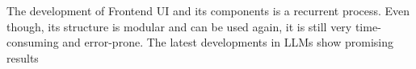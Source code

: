\chapter{\abstractname}

The development of Frontend UI and its components is a recurrent 
process. Even though, its structure is modular and can be used again, 
it is still very time-consuming and error-prone. The latest developments
in LLMs show promising results 